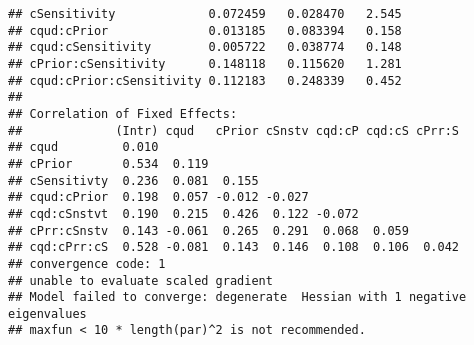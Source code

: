 \documentclass[]{article}
\begin{document}
\begin{verbatim}
## cSensitivity             0.072459   0.028470   2.545
## cqud:cPrior              0.013185   0.083394   0.158
## cqud:cSensitivity        0.005722   0.038774   0.148
## cPrior:cSensitivity      0.148118   0.115620   1.281
## cqud:cPrior:cSensitivity 0.112183   0.248339   0.452
## 
## Correlation of Fixed Effects:
##             (Intr) cqud   cPrior cSnstv cqd:cP cqd:cS cPrr:S
## cqud         0.010                                          
## cPrior       0.534  0.119                                   
## cSensitivty  0.236  0.081  0.155                            
## cqud:cPrior  0.198  0.057 -0.012 -0.027                     
## cqd:cSnstvt  0.190  0.215  0.426  0.122 -0.072              
## cPrr:cSnstv  0.143 -0.061  0.265  0.291  0.068  0.059       
## cqd:cPrr:cS  0.528 -0.081  0.143  0.146  0.108  0.106  0.042
## convergence code: 1
## unable to evaluate scaled gradient
## Model failed to converge: degenerate  Hessian with 1 negative eigenvalues
## maxfun < 10 * length(par)^2 is not recommended.
\end{verbatim}
\end{document}
